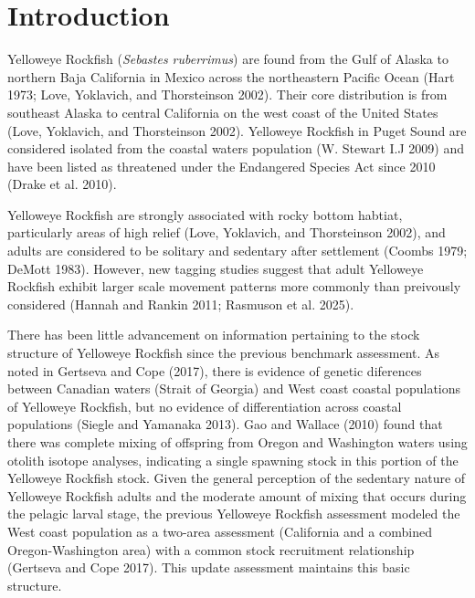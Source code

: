 \documentclass[
]{scrartcl}
\begin{document}
\newpage{}

\newpage{}

\setlength{\parskip}{5mm plus1mm minus1mm}
\setcounter{page}{1}
\setcounter{section}{0}
\renewcommand{\thefigure}{\arabic{figure}}
\renewcommand{\thetable}{\arabic{table}}
\setcounter{table}{0}
\setcounter{figure}{0}

\section{Introduction}\label{introduction}

Yelloweye Rockfish (\emph{Sebastes ruberrimus}) are found from the Gulf
of Alaska to northern Baja California in Mexico across the northeastern
Pacific Ocean (Hart 1973; Love, Yoklavich, and Thorsteinson 2002). Their
core distribution is from southeast Alaska to central California on the
west coast of the United States (Love, Yoklavich, and Thorsteinson
2002). Yelloweye Rockfish in Puget Sound are considered isolated from
the coastal waters population (W. Stewart I.J 2009) and have been listed
as threatened under the Endangered Species Act since 2010 (Drake et al.
2010).

Yelloweye Rockfish are strongly associated with rocky bottom habtiat,
particularly areas of high relief (Love, Yoklavich, and Thorsteinson
2002), and adults are considered to be solitary and sedentary after
settlement (Coombs 1979; DeMott 1983). However, new tagging studies
suggest that adult Yelloweye Rockfish exhibit larger scale movement
patterns more commonly than preivously considered (Hannah and Rankin
2011; Rasmuson et al. 2025).

There has been little advancement on information pertaining to the stock
structure of Yelloweye Rockfish since the previous benchmark assessment.
As noted in Gertseva and Cope (2017), there is evidence of genetic
diferences between Canadian waters (Strait of Georgia) and West coast
coastal populations of Yelloweye Rockfish, but no evidence of
differentiation across coastal populations (Siegle and Yamanaka 2013).
Gao and Wallace (2010) found that there was complete mixing of offspring
from Oregon and Washington waters using otolith isotope analyses,
indicating a single spawning stock in this portion of the Yelloweye
Rockfish stock. Given the general perception of the sedentary nature of
Yelloweye Rockfish adults and the moderate amount of mixing that occurs
during the pelagic larval stage, the previous Yelloweye Rockfish
assessment modeled the West coast population as a two-area assessment
(California and a combined Oregon-Washington area) with a common stock
recruitment relationship (Gertseva and Cope 2017). This update
assessment maintains this basic structure.
\end{document}
